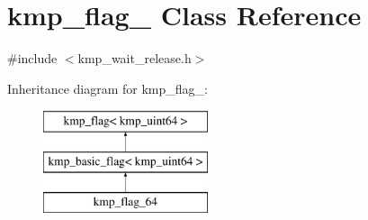 \hypertarget{classkmp__flag__64}{\section{kmp\-\_\-flag\-\_ Class Reference}
\label{classkmp__flag__64}
}


{\ttfamily \#include $<$kmp\-\_\-wait\-\_\-release.\-h$>$}

Inheritance diagram for kmp\-\_\-flag\-\_\-:\begin{figure}[H]
\begin{center}
\leavevmode
\includegraphics[height=3.000000cm]{classkmp__flag__64}
\end{center}
\end{figure}
